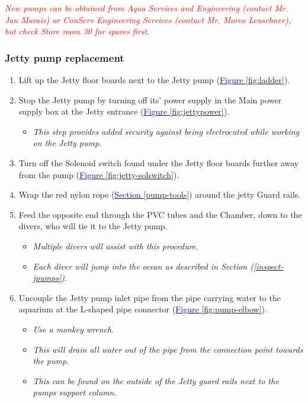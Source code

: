 \documentclass[
  12pt,
]{report}
\providecommand{\tightlist}{%
  \setlength{\itemsep}{0pt}\setlength{\parskip}{0pt}}\usepackage{longtable,booktabs,array}
\begin{document}
\emph{\textcolor{red}{New pumps can be obtained from Aqua Services and Engineering (contact Mr. Jan Marais) or ConServ Engineering Services (contact Mr. Marco Leuschner), but check Store room 30 for spares first}}.

\hypertarget{jetty-pump-replacement}{%
\subsubsection{\texorpdfstring{Jetty pump replacement
\label{pump-replace}}{Jetty pump replacement }}\label{jetty-pump-replacement}}

\begin{enumerate}
\def\labelenumi{\arabic{enumi}.}
\tightlist
\item
  Lift up the Jetty floor boards next to the Jetty pump
  (\ul{\textcolor{blue}{Figure \ref{fig:ladder}}}).
\item
  Stop the Jetty pump by turning off its' power supply in the Main power
  supply box at the Jetty entrance
  (\ul{\textcolor{blue}{Figure \ref{fig:jettypower}}}).

  \begin{itemize}
  \tightlist
  \item
    \emph{This step provides added security against being electrocuted
    while working on the Jetty pump}.
  \end{itemize}
\item
  Turn off the Solenoid switch found under the Jetty floor boards
  further away from the pump
  (\ul{\textcolor{blue}{Figure \ref{fig:jetty-solswitch}}}).
\item
  Wrap the red nylon rope
  (\ul{\textcolor{blue}{Section \ref{pump-tools}}}) around the jetty
  Guard rails.
\item
  Feed the opposite end through the PVC tubes and the Chamber, down to
  the divers, who will tie it to the Jetty pump.

  \begin{itemize}
  \tightlist
  \item
    \emph{Multiple divers will assist with this procedure}.
  \item
    \emph{Each diver will jump into the ocean as described in Section
    (\ul{\textcolor{blue}{\ref{inspect-jpumps}}})}.
  \end{itemize}
\item
  Uncouple the Jetty pump inlet pipe from the pipe carrying water to the
  aquarium at the L-shaped pipe connector
  (\ul{\textcolor{blue}{Figure \ref{fig:pump-elbow}}}).

  \begin{itemize}
  \tightlist
  \item
    \emph{Use a monkey wrench}.
  \item
    \emph{This will drain all water out of the pipe from the connection
    point towards the pump}.
  \item
    \emph{This can be found on the outside of the Jetty guard rails next
    to the pumps support column}.
  \end{itemize}
\end{enumerate}
\end{document}
